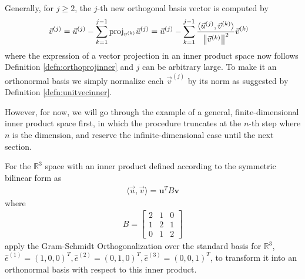 \begin{defn}
\begin{align}
\end{align}
Generally, for $j \geq 2$, the $j$-th new orthogonal basis vector is computed by
\begin{align}
\vec{v}^{(j)} &= \vec{u}^{(j)} - \sum_{k=1}^{j-1}\text{proj}_{v^{(k)}}\vec{u}^{(j)}  = \vec{u}^{(j)} - \sum_{k=1}^{j-1}\frac{\langle \vec{u}^{(j)}, \vec{v}^{(k)} \rangle}{\norm{\vec{v}^{(k)}}^2} \vec{v}^{(k)}
\end{align}
where the expression of a vector projection in an inner product space now follows Definition \ref{defn:orthoprojinner} and $j$ can be arbitrary large. To make it an orthonormal basis we simply normalize each $\vec{v}^{(j)}$ by its norm as suggested by Definition \ref{defn:unitvecinner}.  
\end{defn}
However, for now, we will go through the example of a general, finite-dimensional inner product space first, in which the procedure truncates at the $n$-th step where $n$ is the dimension, and reserve the infinite-dimensional case until the next section.
\begin{exmp}
\label{exmp:R3innerGS}
For the $\mathbb{R}^3$ space with an inner product defined according to the symmetric bilinear form as
\begin{align*}
\langle \vec{u}, \vec{v} \rangle = \textbf{u}^TB\textbf{v}
\end{align*}
where 
\begin{align*}
B =
\begin{bmatrix}
2&1&0\\ 
1&2&1\\
0&1&2
\end{bmatrix}
\end{align*}
apply the Gram-Schmidt Orthogonalization over the standard basis for $\mathbb{R}^3$, $\hat{e}^{(1)} = (1,0,0)^T, \hat{e}^{(2)} = (0,1,0)^T, \hat{e}^{(3)} = (0,0,1)^T$, to transform it into an orthonormal basis with respect to this inner product.
\end{exmp}

